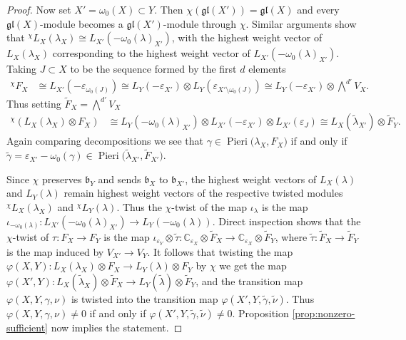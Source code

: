 \documentclass[11pt,fleqn]{amsart}
\newcommand\CC{\mathbb C}
\renewcommand\to{\longrightarrow}
\renewcommand\phi{\varphi}
\renewcommand\epsilon{\varepsilon}
\theoremstyle{definition}
\theoremstyle{remark}
\theoremstyle{remark}
\newcommand\gl{\mathfrak{gl}}
\newcommand\lie[1]{\mathfrak{#1}}
\newcommand\Pieri[2]{\operatorname{Pieri}{(#1},{#2)}}
\newcommand\map[4]{\phi(#3,#4,#1,#2)}
\begin{document}
\begin{proof}
Now set $X' = \omega_0(X) \subset Y$. Then $\chi(\gl(X')) = \gl(X)$ and every 
$\gl(X)$-module becomes a $\gl(X')$-module through $\chi$. Similar arguments 
show that ${}^\chi L_X(\lambda_X) \cong L_{X'}
(-\omega_0(\lambda)_{X'})$, with the highest weight vector of $L_X(\lambda_X)$ 
corresponding to the highest weight vector of $L_{X'}
(-\omega_0(\lambda)_{X'})$. Taking $J \subset X$ to be the sequence formed by 
the first $d$ elements
\begin{align*}
  {}^\chi F_X
    &\cong L_{X'}(-\epsilon_{\omega_0(J)})
    \cong L_Y(-\epsilon_{X'}) \otimes L_Y(\epsilon_{X' \setminus \omega_0(J)})
    \cong L_Y(-\epsilon_{X'}) \otimes \bigwedge^{d'} V_X. 
\end{align*}
Thus setting $\tilde F_X = \bigwedge^{d'} V_X$
\begin{align*}
  {}^\chi(L_X(\lambda_X) \otimes F_X)
    &\cong L_Y(-\omega_0(\lambda)_{X'}) \otimes L_{X'}(-\epsilon_{X'}) \otimes 
      L_{X'}(\epsilon_J) \cong L_X(\tilde \lambda_{X'}) \otimes \tilde F_Y.
\end{align*}
Again comparing decompositions we see that $\gamma \in \Pieri{\lambda_X}{F_X}$ 
if and only if
$\tilde \gamma = \epsilon_{X'} - \omega_0(\gamma) \in \Pieri{\tilde 
\lambda_{X'}}{\tilde F_{X'}}$. 

Since $\chi$ preserves $\lie b_Y$ and sends $\lie b_X$ to $\lie b_{X'}$, the 
highest weight vectors of $L_X(\lambda)$ and $L_Y(\lambda)$ remain highest 
weight vectors of the respective twisted modules ${}^\chi L_{X}(\lambda_X)$ and
${}^\chi L_Y(\lambda)$. Thus the $\chi$-twist of the map 
$\iota_{\lambda}$ is the map $\iota_{-\omega_0(\lambda)}: 
L_{X'}(-\omega_0(\lambda)_{X'}) \to L_Y(-\omega_0(\lambda))$. Direct inspection
shows that the $\chi$-twist of $\tau: F_X \to F_Y$ is the map 
$\iota_{\epsilon_Y} \otimes \tilde\tau: \CC_{\epsilon_X} \otimes \tilde F_X 
\to \CC_{\epsilon_X} \otimes \tilde F_Y$, where $\tilde \tau: \tilde F_X \to 
\tilde F_Y$ is the map induced by $V_{X'} \to V_Y$. It follows that twisting
the map $\phi(X,Y): L_X(\lambda_X) \otimes F_X \to L_Y(\lambda) \otimes F_Y$ 
by $\chi$ we get the map $\phi(X',Y): L_X(\tilde \lambda_X) \otimes \tilde F_X
\to L_Y(\tilde \lambda) \otimes \tilde F_Y$, and the transition map $\phi(X,Y,
\gamma,\nu)$ is twisted into the transition map $\map{\tilde\gamma}{\tilde\nu}
{X'}{Y}$. Thus $\phi(X,Y,\gamma,\nu) \neq 0$ if and only if $\map{\tilde\gamma}
{\tilde\nu}{X'}{Y} \neq 0$. Proposition \ref{prop:nonzero-sufficient} now 
implies the statement.
\end{proof}
\end{document}
